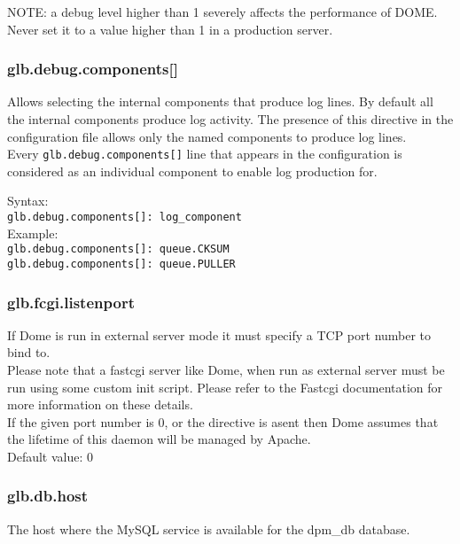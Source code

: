 \documentclass[a4paper,10pt]{scrreprt}
\begin{document}
 NOTE: a debug level higher than 1 severely affects the performance of DOME. Never set it to a value higher than 1 in a production server.\\

\subsubsection{glb.debug.components[]}

 Allows selecting the internal components that produce log lines. By default all the internal components produce log activity. The presence of this directive in the configuration file allows only the named components to produce log lines.\\

 Every \lstinline"glb.debug.components[]" line that appears in the configuration is considered as an individual component to enable log production for.

 Syntax:\\

\lstinline"glb.debug.components[]: log_component"\\

 Example:\\
\lstinline"glb.debug.components[]: queue.CKSUM"\\
\lstinline"glb.debug.components[]: queue.PULLER"\\


\subsubsection{glb.fcgi.listenport}
If Dome is run in external server mode it must specify a TCP port number to bind to.\\
Please note that a fastcgi server like Dome, when run as external server must be run using some custom init script. Please refer to the Fastcgi documentation for more information on these details.\\
If the given port number is 0, or the directive is asent then Dome assumes that the lifetime of this daemon will be managed by Apache.\\

Default value: 0\\

\subsubsection{glb.db.host}
The host where the MySQL service is available for the dpm\_db database.\\
\end{document}
